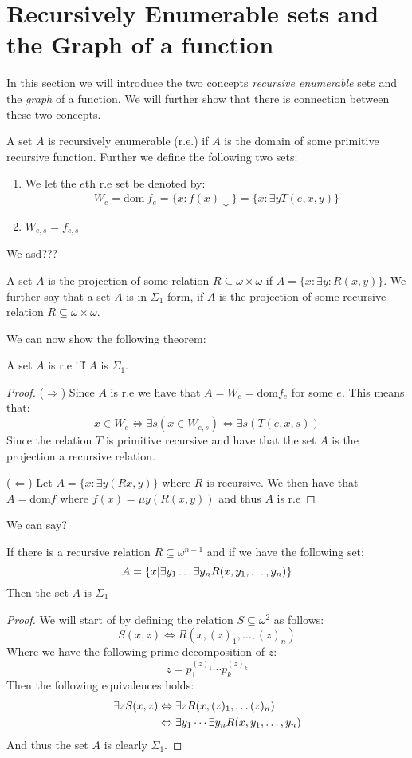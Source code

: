 \documentclass[../main.tex]{subfiles}
\begin{document}
\section{Recursively Enumerable sets and the Graph of a function}
In this section we will introduce the two concepts \textit{recursive
enumerable} sets and the \textit{graph} of a function. We will further show
that there is connection between these two concepts.
\begin{defi}
	A set $A$ is recursively enumerable (r.e.) if $A$ is the domain of some
	primitive recursive function. Further we define the following two sets:
	\begin{enumerate}
		\item We let the $e$th r.e set be denoted by:
			$$W_e=\text{dom}\ f_e= \{x:f(x)\downarrow\}=\{x:\exists
			y T(e,x,y)\}$$
		\item $W_{e,s}=f_{e,s}$
	\end{enumerate}
\end{defi}
We asd???
\begin{defi}
	A set $A$ is the projection of some relation $R\subseteq
	\omega\times\omega$ if $A=\{x:\exists y: R(x,y)\}$. We further say that
	a set $A$ is in $\Sigma_1$ form, if $A$ is the projection of some
	recursive relation $R\subseteq\omega\times\omega$.
\end{defi}
We can now show the following theorem:
\begin{thm}
	A set $A$ is r.e iff $A$ is $\Sigma_1$.
\end{thm}
\begin{proof}
	($\Rightarrow$) Since $A$ is r.e we have that $A=W_e=\text{dom} f_e$
	for some $e$. This means that:
	$$x\in W_e\Leftrightarrow\exists s(x\in W_{e,s})\Leftrightarrow \exists
	s(T(e,x,s))$$
	Since the relation $T$ is primitive recursive and have that the set $A$
	is the projection a recursive relation.

	($\Leftarrow$) Let $A=\{x:\exists y(Rx,y)\}$ where $R$ is recursive. We
	then have that $A=\text{dom} f$ where $f(x)=\mu y(R(x,y))$ and thus $A$
	is r.e
\end{proof}
We can say?
\begin{thm}
	If there is a recursive relation $R\subseteq\omega^{n+1}$ and if we
	have the following set:
	$$A=\{x|\exists y_1\ldots\exists  y_n R(x,y_1,\ldots,y_n)\}$$
	Then the set $A$ is $\Sigma_1$
\end{thm}
\begin{proof}
	We will start of by defining the relation $S\subseteq\omega^2$ as
	follows:
	$$S(x,z)\Leftrightarrow R(x,(z)_1,\ldots,(z)_n)$$
	Where we have the following prime decomposition of $z$:
	$$z=p_1^{(z)_1}\cdots p_k^{(z)_k}$$
	Then the following equivalences holds:
	\begin{align*}
		\exists zS(x,z)&\Leftrightarrow \exists z R(x,(z)_1,\ldots
		(z)_n)\\
			       &\Leftrightarrow \exists y_1\cdots \exists y_n
			       R(x,y_1,\ldots,y_n)
	\end{align*}
	And thus the set $A$ is clearly $\Sigma_1$.
\end{proof}
\end{document}
